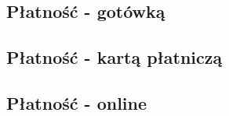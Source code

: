 \begin{landscape}
	\newpage
	\subsection{Płatność - gotówką}
	\begin{figure}
		
	\end{figure}
		
	\newpage
	\subsection{Płatność - kartą płatniczą}
	\begin{figure}
		
	\end{figure}
		
	\newpage
	\subsection{Płatność - online}
	\begin{figure}
		
	\end{figure}
	   
\end{landscape}